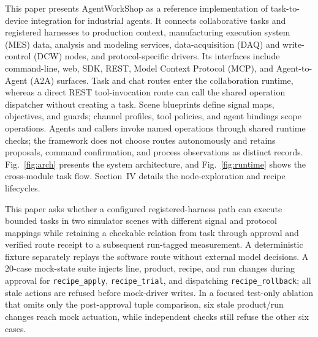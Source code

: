 This paper presents AgentWorkShop as a reference implementation of
task-to-device integration for industrial agents. It connects collaborative tasks
and registered harnesses to production context, manufacturing execution
system (MES) data, analysis and modeling services, data-acquisition (DAQ) and
write-control (DCW) nodes, and protocol-specific drivers. Its interfaces include
command-line, web, SDK, REST, Model Context Protocol (MCP), and Agent-to-Agent
(A2A) surfaces. Task and chat routes enter the
collaboration runtime, whereas a direct REST tool-invocation route can call
the shared operation dispatcher without creating a task.
Scene blueprints define signal maps, objectives, and guards; channel profiles,
tool policies, and agent bindings scope operations. Agents and callers invoke
named operations through shared runtime checks; the framework does not choose
routes autonomously and retains proposals, command confirmation, and process
observations as distinct records. Fig.~\ref{fig:arch} presents the system
architecture, and Fig.~\ref{fig:runtime} shows the cross-module task flow.
Section~IV details the node-exploration and recipe lifecycles.

This paper asks whether a configured registered-harness path can execute
bounded tasks in two simulator scenes with different signal and protocol
mappings while retaining a checkable relation from task through approval and
verified route receipt to a subsequent run-tagged measurement. A deterministic
fixture separately replays the software route without external model
decisions. A 20-case mock-state suite injects line, product, recipe, and run
changes during approval for \texttt{recipe\_apply}, \texttt{recipe\_trial},
and dispatching \texttt{recipe\_rollback}; all stale actions are refused
before mock-driver writes. In a focused test-only ablation that omits only the
post-approval tuple comparison, six stale product/run changes reach mock
actuation, while independent checks still refuse the other six cases.

